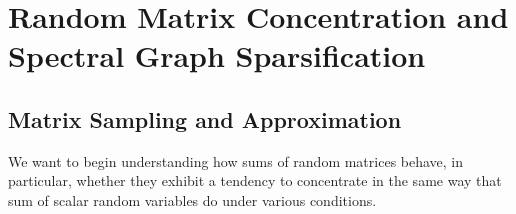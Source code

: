
\chapter{Random Matrix Concentration and Spectral Graph
  Sparsification}







%
\sloppy



\section{Matrix Sampling and Approximation}

We want to begin understanding how sums of random matrices behave, in
particular, whether they exhibit a tendency to concentrate in the same
way that sum of scalar random variables do under various conditions.

